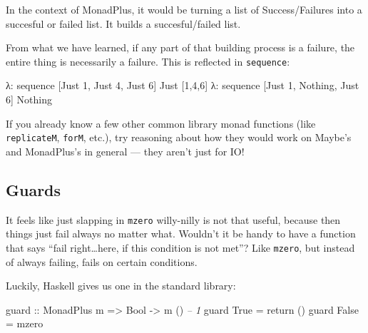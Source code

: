 \documentclass[]{article}
\newenvironment{Shaded}{}{}
\newcommand{\DataTypeTok}[1]{\textcolor[rgb]{0.56,0.13,0.00}{{#1}}}
\newcommand{\DecValTok}[1]{\textcolor[rgb]{0.25,0.63,0.44}{{#1}}}
\newcommand{\CommentTok}[1]{\textcolor[rgb]{0.38,0.63,0.69}{\textit{{#1}}}}
\newcommand{\OtherTok}[1]{\textcolor[rgb]{0.00,0.44,0.13}{{#1}}}
\newcommand{\FunctionTok}[1]{\textcolor[rgb]{0.02,0.16,0.49}{{#1}}}
\newcommand{\NormalTok}[1]{{#1}}
\begin{document}
In the context of MonadPlus, it would be turning a list of
Success/Failures into a succesful or failed list. It builds a
succesful/failed list.

From what we have learned, if any part of that building process is a
failure, the entire thing is necessarily a failure. This is reflected in
\texttt{sequence}:

\begin{Shaded}
\begin{Highlighting}[]
\NormalTok{λ}\FunctionTok{:} \NormalTok{sequence [}\DataTypeTok{Just} \DecValTok{1}\NormalTok{, }\DataTypeTok{Just} \DecValTok{4}\NormalTok{, }\DataTypeTok{Just} \DecValTok{6}\NormalTok{]}
\DataTypeTok{Just} \NormalTok{[}\DecValTok{1}\NormalTok{,}\DecValTok{4}\NormalTok{,}\DecValTok{6}\NormalTok{]}
\NormalTok{λ}\FunctionTok{:} \NormalTok{sequence [}\DataTypeTok{Just} \DecValTok{1}\NormalTok{, }\DataTypeTok{Nothing}\NormalTok{, }\DataTypeTok{Just} \DecValTok{6}\NormalTok{]}
\DataTypeTok{Nothing}
\end{Highlighting}
\end{Shaded}

If you already know a few other common library monad functions (like
\texttt{replicateM}, \texttt{forM}, etc.), try reasoning about how they
would work on Maybe's and MonadPlus's in general --- they aren't just
for IO!

\subsection{Guards}\label{guards}

It feels like just slapping in \texttt{mzero} willy-nilly is not that
useful, because then things just fail always no matter what. Wouldn't it
be handy to have a function that says ``fail right\ldots{}here, if this
condition is not met''? Like \texttt{mzero}, but instead of always
failing, fails on certain conditions.

Luckily, Haskell gives us one in the standard library:

\begin{Shaded}
\begin{Highlighting}[]
\OtherTok{guard ::} \DataTypeTok{MonadPlus} \NormalTok{m }\OtherTok{=>} \DataTypeTok{Bool} \OtherTok{->} \NormalTok{m ()        }\CommentTok{-- 1}
\NormalTok{guard }\DataTypeTok{True}  \FunctionTok{=} \NormalTok{return ()}
\NormalTok{guard }\DataTypeTok{False} \FunctionTok{=} \NormalTok{mzero}
\end{Highlighting}
\end{Shaded}
\end{document}
